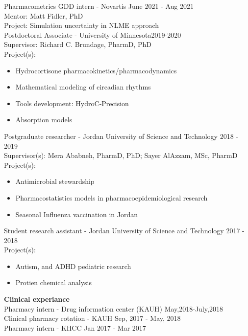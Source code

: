 \documentclass[a4paper,11pt]{article}
\begin{document}
Pharmacometrics GDD intern - Novartis \hfill June 2021 - Aug 2021\\
Mentor: Matt Fidler, PhD \\
Project: Simulation uncertainty in NLME approach \\

Postdoctoral Associate - University of Minnesota\hfill 2019-2020\\
Supervisor: Richard C. Brundage, PharmD, PhD\\
Project(s):\\
\begin{itemize}
\item Hydrocortisone pharmacokinetics/pharmacodynamics
\item Mathematical modeling of circadian rhythms
\item Tools development: HydroC-Precision
\item Absorption models
\end{itemize}

Postgraduate researcher - Jordan University of Science and Technology \hfill 2018 - 2019\\
Supervisor(s): Mera Ababneh, PharmD, PhD; Sayer AlAzzam, MSc, PharmD \\
Project(s):
\begin{itemize}
\item Antimicrobial stewardship
\item Pharmacostatistics models in pharmacoepidemiological research
\item Seasonal Influenza vaccination in Jordan
\end{itemize}

Student research assistant - Jordan University of Science and Technology \hfill 2017 - 2018\\
Project(s):
\begin{itemize}
\item Autism, and ADHD pediatric research
\item Protien chemical analysis
\end{itemize}

\textbf{Clinical experiance}\\

Pharmacy intern - Drug information center (KAUH) \hfill May,2018-July,2018 \\

Clinical pharmacy rotation - KAUH \hfill Sep, 2017 - May, 2018 \\

Pharmacy intern - KHCC \hfill Jan 2017 - Mar 2017 \\
\end{document}
